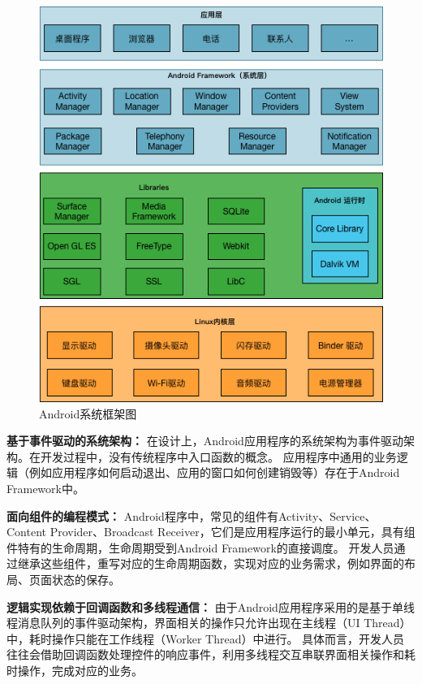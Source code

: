 \begin{figure}[!h]
	\centering
	\includegraphics[height=0.6\textheight]{./Figures/Android-Framework.png}
	\caption{Android系统框架图}
	\label{fig:Android-Framework}
\end{figure}


\textbf{基于事件驱动的系统架构：}
在设计上，Android应用程序的系统架构为事件驱动架构。在开发过程中，没有传统程序中入口函数的概念。
应用程序中通用的业务逻辑（例如应用程序如何启动退出、应用的窗口如何创建销毁等）存在于Android Framework中。

\textbf{面向组件的编程模式：}
Android程序中，常见的组件有Activity、Service、Content Provider、Broadcast Receiver，它们是应用程序运行的最小单元，具有组件特有的生命周期，生命周期受到Android Framework的直接调度。
开发人员通过继承这些组件，重写对应的生命周期函数，实现对应的业务需求，例如界面的布局、页面状态的保存。

\textbf{逻辑实现依赖于回调函数和多线程通信：}
由于Android应用程序采用的是基于单线程消息队列的事件驱动架构，界面相关的操作只允许出现在主线程（UI Thread）中，耗时操作只能在工作线程（Worker Thread）中进行。
具体而言，开发人员往往会借助回调函数处理控件的响应事件，利用多线程交互串联界面相关操作和耗时操作，完成对应的业务。


